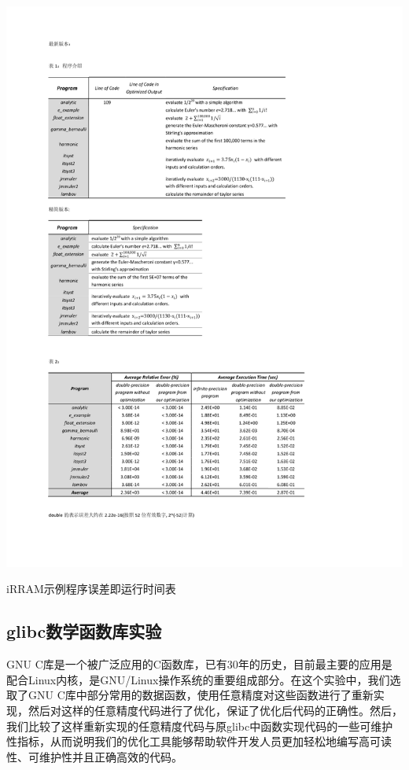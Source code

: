 \begin{table}[thbp]
   \centering
   \includegraphics[width=\columnwidth]{fig/EvalTable_ErrorTime.pdf}
   \caption{iRRAM示例程序误差即运行时间表} \label{fig:error_time}
\end{table}

\subsection{glibc数学函数库实验}

GNU C库是一个被广泛应用的C函数库，已有30年的历史，目前最主要的应用是配合Linux内核，是GNU/Linux操作系统的重要组成部分。在这个实验中，我们选取了GNU C库中部分常用的数据函数，使用任意精度对这些函数进行了重新实现，然后对这样的任意精度代码进行了优化，保证了优化后代码的正确性。然后，我们比较了这样重新实现的任意精度代码与原glibc中函数实现代码的一些可维护性指标，从而说明我们的优化工具能够帮助软件开发人员更加轻松地编写高可读性、可维护性并且正确高效的代码。

